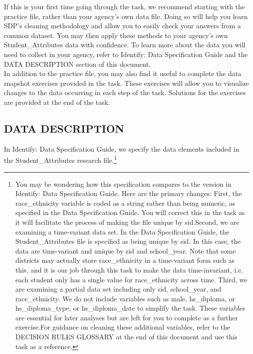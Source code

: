 \documentclass[12pt]{article}
\begin{document}
If this is your first time going through the task, we recommend starting with the practice file, rather than your agency's own 
data file.  Doing so will help you learn SDP's cleaning methodology and allow you to easily check your answers from a common 
dataset.  You may then apply these methods to your agency's own Student\_Attributes data with confidence.  To learn more about 
the data you will need to collect in your agency, refer to Identify: Data Specification Guide and the DATA DESCRIPTION section of 
this document.\\

In addition to the practice file, you may also find it useful to complete the data snapshot exercises provided in the task.  These 
exercises will allow you to visualize changes to the data occurring in each step of the task.  Solutions for the exercises are 
provided at the end of the task. 

\subsection{DATA DESCRIPTION}
In Identify: Data Specification Guide, we specify the data elements included in the Student\_Attributes research file.\footnote{
You may be wondering how  this specification compares to the  version in Identify: Data Specification Guide. Here are the primary changes:
First, the race\_ethnicity variable is coded as a string rather than being numeric, as specified in the Data Specification Guide.  You will correct this in the task as it will facilitate the process of making the file unique by sid.Second, we are examining a time-variant data set. In the Data Specification Guide, the Student\_Attributes file is specified as being unique by sid.  In this case, the data are time-variant and unique by sid and school\_year. Note that some districts may actually store race\_ethnicity in a time-variant form such as this, and it is our job through this task to make the data time-invariant, i.e. each student only has a single value for race\_ethnicity across time. Third, we are examining a partial data set including only sid, school\_year, and race\_ethnicity.  We do not include variables such as male, hs\_diploma, or hs\_diploma\_type, or hs\_diploma\_date to simplify the task.  These variables are essential for later analyses but are left for you to complete as a further exercise.For guidance on cleaning these additional variables, refer to the DECISION RULES GLOSSARY at the end of this document and use this task as a reference.}
\end{document}
